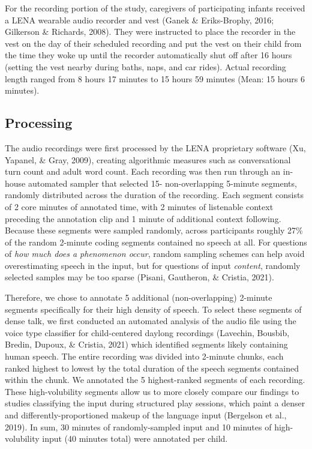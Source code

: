 \documentclass[
  man,floatsintext]{apa6}
\begin{document}
For the recording portion of the study, caregivers of participating infants received a LENA wearable audio recorder and vest (Ganek \& Eriks-Brophy, 2016; Gilkerson \& Richards, 2008). They were instructed to place the recorder in the vest on the day of their scheduled recording and put the vest on their child from the time they woke up until the recorder automatically shut off after 16 hours (setting the vest nearby during baths, naps, and car rides). Actual recording length ranged from 8 hours 17 minutes to 15 hours 59 minutes (Mean: 15 hours 6 minutes).

\hypertarget{processing}{%
\subsection{Processing}\label{processing}}

The audio recordings were first processed by the LENA proprietary software (Xu, Yapanel, \& Gray, 2009), creating algorithmic measures such as conversational turn count and adult word count. Each recording was then run through an in-house automated sampler that selected 15- non-overlapping 5-minute segments, randomly distributed across the duration of the recording. Each segment consists of 2 core minutes of annotated time, with 2 minutes of listenable context preceding the annotation clip and 1 minute of additional context following. Because these segments were sampled randomly, across participants roughly 27\% of the random 2-minute coding segments contained no speech at all. For questions of \emph{how much does a phenomenon occur}, random sampling schemes can help avoid overestimating speech in the input, but for questions of input \emph{content}, randomly selected samples may be too sparse (Pisani, Gautheron, \& Cristia, 2021).

Therefore, we chose to annotate 5 additional (non-overlapping) 2-minute segments specifically for their high density of speech. To select these segments of dense talk, we first conducted an automated analysis of the audio file using the voice type classifier for child-centered daylong recordings (Lavechin, Bousbib, Bredin, Dupoux, \& Cristia, 2021) which identified segments likely containing human speech. The entire recording was divided into 2-minute chunks, each ranked highest to lowest by the total duration of the speech segments contained within the chunk. We annotated the 5 highest-ranked segments of each recording. These high-volubility segments allow us to more closely compare our findings to studies classifying the input during structured play sessions, which paint a denser and differently-proportioned makeup of the language input (Bergelson et al., 2019). In sum, 30 minutes of randomly-sampled input and 10 minutes of high-volubility input (40 minutes total) were annotated per child.
\end{document}
